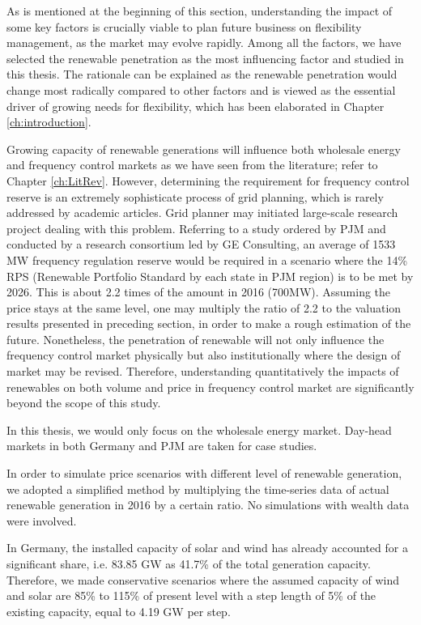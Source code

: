 As is mentioned at the beginning of this section, understanding the impact of some key factors is crucially viable to plan future business on flexibility management, as the market may evolve rapidly. Among all the factors, we have selected the renewable penetration as the most influencing factor and studied in this thesis. The rationale can be explained as the renewable penetration would change most radically compared to other factors and is viewed as the essential driver of growing needs for flexibility, which has been elaborated in Chapter \ref{ch:introduction}. 

Growing capacity of renewable generations will influence both wholesale energy and frequency control markets as we have seen from the literature; refer to Chapter \ref{ch:LitRev}. However, determining the requirement for frequency control reserve is an extremely sophisticate process of grid planning, which is rarely addressed by academic articles. Grid planner may initiated large-scale research project dealing with this problem. Referring to a study ordered by PJM and conducted by a research consortium led by GE Consulting\cite{GEEnergyConsulting2014}, an average of 1533 MW frequency regulation reserve would be required in a scenario where the 14\% RPS (Renewable Portfolio Standard by each state in PJM region) is to be met by 2026. This is about 2.2 times of the amount in 2016 (700MW). Assuming the price stays at the same level, one may multiply the ratio of 2.2 to the valuation results presented in preceding section, in order to make a rough estimation of the future. Nonetheless, the penetration of renewable will not only influence the frequency control market physically but also institutionally where the design of market may be revised. Therefore, understanding quantitatively the impacts of renewables on both volume and price in frequency control market are significantly beyond the scope of this study. 

In this thesis, we would only focus on the wholesale energy market. Day-head markets in both Germany and PJM are taken for case studies.

In order to simulate price scenarios with different level of renewable generation, we adopted a simplified method by multiplying the time-series data of actual renewable generation in 2016 by a certain ratio. No simulations with wealth data were involved. 

In Germany, the installed capacity of solar and wind has already accounted for a significant share, i.e. \num{83.85} GW as 41.7\% of the total generation capacity. Therefore, we made conservative scenarios where the assumed capacity of wind and solar are 85\% to 115\% of present level with a step length of 5\% of the existing capacity, equal to 4.19 GW per step. 

